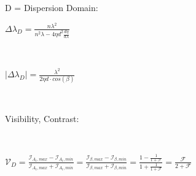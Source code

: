 D = Dispersion Domain:

$
\Delta \lambda_{D} = \frac{n \lambda^2}{n^2 \lambda - 4 \eta d^2 \frac{d\eta}{d\lambda}}
$

\

$
\left| \Delta \lambda_{D} \right| = 
\frac{\lambda^2}{ 2 \eta d \cdot cos(\beta) }
$

\

Visibility, Contrast:

\

$
\mathcal{V}_D = 
\frac{ \mathscr{I}_{A_t,max} - \mathscr{I}_{A_t,min} }{ \mathscr{I}_{A_t,max} + \mathscr{I}_{A_t,min} } = 
\frac{ \mathscr{I}_{\beta,max} - \mathscr{I}_{\beta,min} }{ \mathscr{I}_{\beta,max} + \mathscr{I}_{\beta,min} } = 
\frac{ 1 - \frac{1}{1 + \mathcal{F}} }{ 1 + \frac{1}{1 + \mathcal{F}} } = 
\frac{\mathcal{F}}{2 + \mathcal{F}}
$

